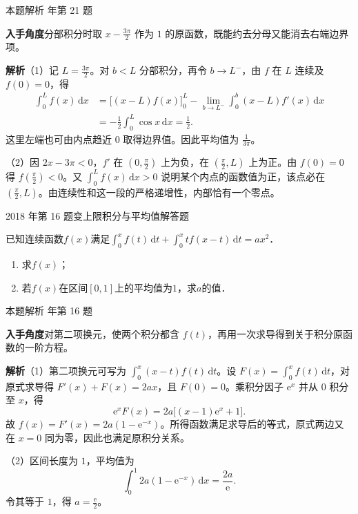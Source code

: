 \documentclass[UTF8,zihao=-4,fontset=fandol]{ctexart}
\renewcommand{\lim}{\operatorname*{lim}\limits}
\newcommand{\QuestionPage}[6]{%
  \par\noindent\begin{minipage}{\linewidth}
  \raggedright
  {\small\textcolor{black!60}{#3\quad #5}\hfill\textcolor{accent}{#2}}\par\smallskip}
\newcommand{\QuestionEnd}{\end{minipage}\par\medskip}
\newcommand{\QuestionPage}[6]{%
  \clearpage
  {\small\textcolor{accent}{#1\hfill #2}}\par\medskip
  {\small\textcolor{black!60}{#3\quad #5\hfill #6}}\par\vspace{9bp}}
\newcommand{\QuestionEnd}{}
\newenvironment{QuestionSolution}[1]{%
  \clearpage
  {\small\textcolor{black!60}{本题解析\quad #1}}\par\medskip
}{\par\clearpage}
\begin{document}
\begin{QuestionSolution}{2016 年第 21 题}
\textbf{入手角度}\quad 分部积分时取 \(x-\frac{3\pi}{2}\) 作为 \(1\) 的原函数，既能约去分母又能消去右端边界项。

\textbf{解析}\quad （1）记 \(L=\frac{3\pi}{2}\)。对 \(b<L\) 分部积分，再令 \(b\to L^-\)，由 \(f\) 在 \(L\) 连续及 \(f(0)=0\)，得
\[
\begin{aligned}
\int_0^L f(x)\,\mathrm{d}x
&=\bigl[(x-L)f(x)\bigr]_0^L
-\lim_{b\to L^-}\int_0^b (x-L)f'(x)\,\mathrm{d}x\\
&=-\frac12\int_0^L\cos x\,\mathrm{d}x=\frac12 .
\end{aligned}
\]
这里左端也可由内点趋近 \(0\) 取得边界值。因此平均值为 \(\boxed{\frac{1}{3\pi}}\)。

（2）因 \(2x-3\pi<0\)，\(f'\) 在 \((0,\frac{\pi}{2})\) 上为负，在 \((\frac{\pi}{2},L)\) 上为正。由 \(f(0)=0\) 得 \(f(\frac{\pi}{2})<0\)。又 \(\int_0^L f(x)\,\mathrm{d}x>0\) 说明某个内点的函数值为正，该点必在 \((\frac{\pi}{2},L)\)。由连续性和这一段的严格递增性，内部恰有一个零点。
\end{QuestionSolution}

\QuestionPage{3.2 微积分基本公式与基本定理}{解答题}{2018 年第 16 题}{2}{变上限积分与平均值}{149 / 234}
已知连续函数$f(x)$满足$\int_0^x f(t)\,\mathrm{d} t + \int_0^x tf(x - t)\,\mathrm{d} t = ax^2$．
\begin{enumerate}
\item 求$f(x)$；
\item 若$f(x)$在区间$[0,1]$上的平均值为$1$，求$a$的值．
\end{enumerate}
\QuestionEnd

\begin{QuestionSolution}{2018 年第 16 题}
\textbf{入手角度}\quad 对第二项换元，使两个积分都含 \(f(t)\)，再用一次求导得到关于积分原函数的一阶方程。

\textbf{解析}\quad （1）第二项换元可写为 \(\int_0^x(x-t)f(t)\,\mathrm{d}t\)。设 \(F(x)=\int_0^x f(t)\,\mathrm{d}t\)，对原式求导得 \(F'(x)+F(x)=2ax\)，且 \(F(0)=0\)。乘积分因子 \(\mathrm{e}^x\) 并从 \(0\) 积分至 \(x\)，得
\[
\mathrm{e}^xF(x)=2a\bigl[(x-1)\mathrm{e}^x+1\bigr].
\]
故 \(f(x)=F'(x)=\boxed{2a(1-\mathrm{e}^{-x})}\)。所得函数满足求导后的等式，原式两边又在 \(x=0\) 同为零，因此也满足原积分关系。

（2）区间长度为 \(1\)，平均值为
\[
\int_0^1 2a(1-\mathrm{e}^{-x})\,\mathrm{d}x=\frac{2a}{\mathrm{e}}.
\]
令其等于 \(1\)，得 \(a=\boxed{\frac{\mathrm{e}}{2}}\)。
\end{QuestionSolution}
\end{document}

